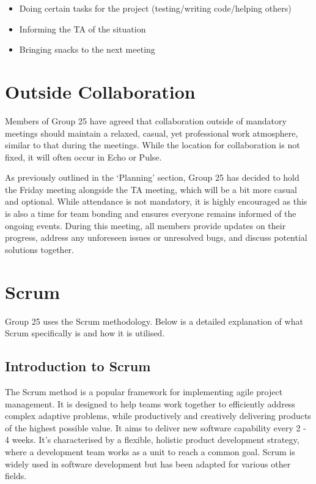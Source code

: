 \documentclass[sigconf,nonacm]{acmart}
\begin{document}
\begin{itemize}
    \item Doing certain tasks for the project (testing/writing code/helping others)
    \item Informing the TA of the situation
    \item Bringing snacks to the next meeting
\end{itemize}

\section{Outside Collaboration}
Members of Group 25 have agreed that collaboration outside of mandatory meetings should maintain a relaxed, casual, yet professional work atmosphere, similar to that during the meetings. While the location for collaboration is not fixed, it will often occur in Echo or Pulse.

As previously outlined in the ‘Planning’ section, Group 25 has decided to hold the Friday meeting alongside the TA meeting, which will be a bit more casual and optional. While attendance is not mandatory, it is highly encouraged as this is also a time for team bonding and ensures everyone remains informed of the ongoing events. During this meeting, all members provide updates on their progress, address any unforeseen issues or unresolved bugs, and discuss potential solutions together.



\section{Scrum}
Group 25 uses the Scrum methodology. Below is a detailed explanation of what Scrum specifically is and how it is utilised.

\subsection{Introduction to Scrum}
The Scrum method is a popular framework for implementing agile project management. It is designed to help teams work together to efficiently address complex adaptive problems, while productively and creatively delivering products of the highest possible value. It aims to deliver new software capability every 2 - 4 weeks. It's characterised by a flexible, holistic product development strategy, where a development team works as a unit to reach a common goal. Scrum is widely used in software development but has been adapted for various other fields.
\end{document}
